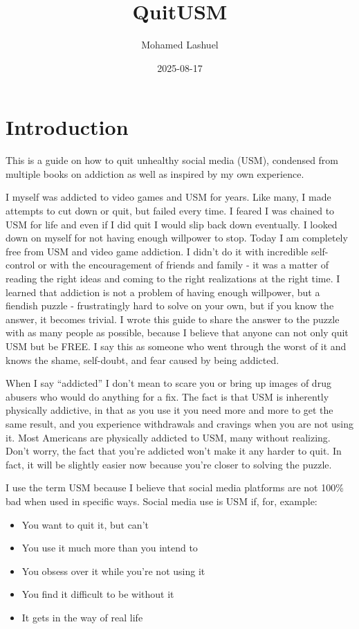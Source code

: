 \documentclass[
  openany]{book}
\title{QuitUSM}
\author{Mohamed Lashuel}
\date{2025-08-17}
\providecommand{\tightlist}{%
  \setlength{\itemsep}{0pt}\setlength{\parskip}{0pt}}
\begin{document}
\maketitle

{
\setcounter{tocdepth}{1}
\tableofcontents
}
\chapter{Introduction}\label{introduction}

This is a guide on how to quit unhealthy social media (USM), condensed from multiple books on addiction as well as inspired by my own experience.

I myself was addicted to video games and USM for years. Like many, I made attempts to cut down or quit, but failed every time. I feared I was chained to USM for life and even if I did quit I would slip back down eventually. I looked down on myself for not having enough willpower to stop. Today I am completely free from USM and video game addiction. I didn't do it with incredible self-control or with the encouragement of friends and family - it was a matter of reading the right ideas and coming to the right realizations at the right time. I learned that addiction is not a problem of having enough willpower, but a fiendish puzzle - frustratingly hard to solve on your own, but if you know the answer, it becomes trivial. I wrote this guide to share the answer to the puzzle with as many people as possible, because I believe that anyone can not only quit USM but be FREE. I say this as someone who went through the worst of it and knows the shame, self-doubt, and fear caused by being addicted.

When I say ``addicted'' I don't mean to scare you or bring up images of drug abusers who would do anything for a fix. The fact is that USM is inherently physically addictive, in that as you use it you need more and more to get the same result, and you experience withdrawals and cravings when you are not using it. Most Americans are physically addicted to USM, many without realizing. Don't worry, the fact that you're addicted won't make it any harder to quit. In fact, it will be slightly easier now because you're closer to solving the puzzle.

I use the term USM because I believe that social media platforms are not 100\% bad when used in specific ways. Social media use is USM if, for, example:

\begin{itemize}
\tightlist
\item
  You want to quit it, but can't
\item
  You use it much more than you intend to
\item
  You obsess over it while you're not using it
\item
  You find it difficult to be without it
\item
  It gets in the way of real life
\end{itemize}
\end{document}
